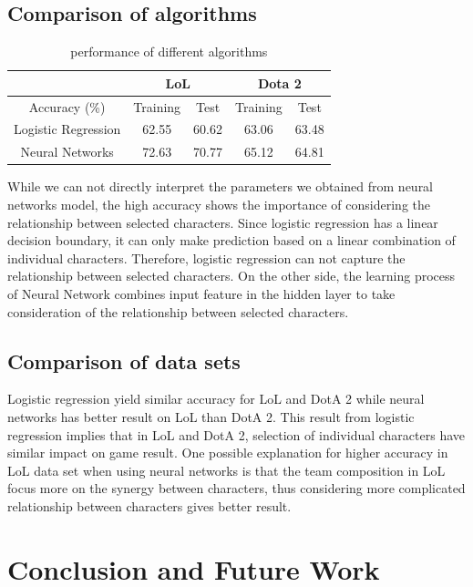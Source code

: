 \documentclass{article} %
\begin{document}
\subsection{Comparison of algorithms}

\begin{table}[ht]
\center
{}
\caption{performance of different algorithms}
\begin{tabular}{|c |c |c |c |c |}
\hline
& \multicolumn{2}{c|}{LoL}    & \multicolumn{2}{c|}{Dota 2}   \\
\hline
Accuracy (\%)                       & Training   & Test  & Training  & Test  \\ \hline
Logistic Regression    & 62.55         & 60.62     & 63.06         & 63.48     \\ \hline
Neural Networks       & 72.63        & 70.77     & 65.12        &64.81     \\ \hline
\end{tabular}
\end{table}

While we can not directly interpret the parameters we obtained from neural networks model, the high accuracy shows the importance of considering the relationship between selected characters. Since logistic regression has a linear decision boundary, it can only make prediction based on a linear combination of individual characters. Therefore, logistic regression can not capture the relationship between selected characters. On the other side, the learning process of Neural Network combines input feature in the hidden layer to take consideration of the relationship between selected characters.

\subsection{Comparison of data sets}
Logistic regression yield similar accuracy for LoL and DotA 2 while neural networks has better result on LoL than DotA 2. This result from logistic regression implies that in LoL and DotA 2, selection of individual characters have similar impact on game result. One possible explanation for higher accuracy in LoL data set when using neural networks is that the team composition in LoL focus more on the synergy between characters, thus considering more complicated relationship between characters gives better result.



\section{Conclusion and Future Work}
\end{document}
